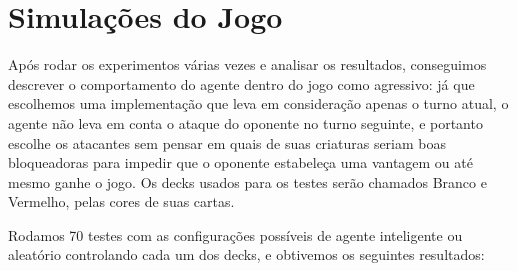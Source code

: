 \section{Simulações do Jogo}
Após rodar os experimentos várias vezes e analisar os resultados, conseguimos descrever o comportamento do agente dentro do jogo como agressivo: já que escolhemos uma implementação que leva em consideração apenas o turno atual, o agente não leva em conta o ataque do oponente no turno seguinte, e portanto escolhe os atacantes sem pensar em quais de suas criaturas seriam boas bloqueadoras para impedir que o oponente estabeleça uma vantagem ou até mesmo ganhe o jogo. Os decks usados para os testes serão chamados Branco e Vermelho, pelas cores de suas cartas.

Rodamos 70 testes com as configurações possíveis de agente inteligente ou aleatório controlando cada um dos decks, e obtivemos os seguintes resultados:


